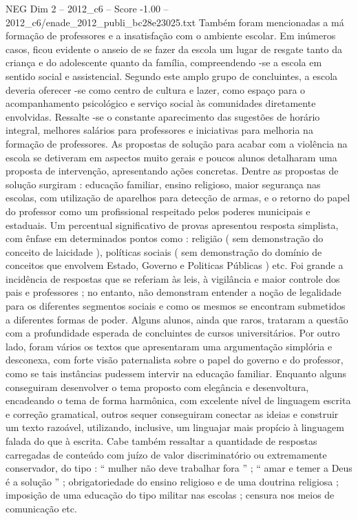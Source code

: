 \begin{textsample}{NEG Dim 2 – 2012\_c6 – Score -1.00 – 2012\_c6/enade\_2012\_publi\_bc28e23025.txt}
Também foram mencionadas a má formação de professores e a insatisfação com o ambiente escolar.
Em inúmeros casos, ficou evidente o anseio de se fazer da escola um lugar de resgate tanto da criança e do adolescente quanto da família, compreendendo -se a escola em sentido social e assistencial.
Segundo este amplo grupo de concluintes, a escola deveria oferecer -se como centro de cultura e lazer, como espaço para o acompanhamento psicológico e serviço social às comunidades diretamente envolvidas.
Ressalte -se o constante aparecimento das sugestões de horário integral, melhores salários para professores e iniciativas para melhoria na formação de professores.
As propostas de solução para acabar com a violência na escola se detiveram em aspectos muito gerais e poucos alunos detalharam uma proposta de intervenção, apresentando ações concretas.
Dentre as propostas de solução surgiram : educação familiar, ensino religioso, maior segurança nas escolas, com utilização de aparelhos para detecção de armas, e o retorno do papel do professor como um profissional respeitado pelos poderes municipais e estaduais.
Um percentual significativo de provas apresentou resposta simplista, com ênfase em determinados pontos como : religião ( sem demonstração do conceito de laicidade ), políticas sociais ( sem demonstração do domínio de conceitos que envolvem Estado, Governo e Politicas Públicas ) etc.
Foi grande a incidência de respostas que se referiam às leis, à vigilância e maior controle dos pais e professores ; no entanto, não demonstram entender a noção de legalidade para os diferentes segmentos sociais e como os mesmos se encontram submetidos a diferentes formas de poder.
Alguns alunos, ainda que raros, trataram a questão com a profundidade esperada de concluintes de cursos universitários.
Por outro lado, foram vários os textos que apresentaram uma argumentação simplória e desconexa, com forte visão paternalista sobre o papel do governo e do professor, como se tais instâncias pudessem intervir na educação familiar.
Enquanto alguns conseguiram desenvolver o tema proposto com elegância e desenvoltura, encadeando o tema de forma harmônica, com excelente nível de linguagem escrita e correção gramatical, outros sequer conseguiram conectar as ideias e construir um texto razoável, utilizando, inclusive, um linguajar mais propício à linguagem falada do que à escrita.
Cabe também ressaltar a quantidade de respostas carregadas de conteúdo com juízo de valor discriminatório ou extremamente conservador, do tipo : “ mulher não deve trabalhar fora ” ; “ amar e temer a Deus é a solução ” ; obrigatoriedade do ensino religioso e de uma doutrina religiosa ; imposição de uma educação do tipo militar nas escolas ; censura nos meios de comunicação etc.

\end{textsample}
